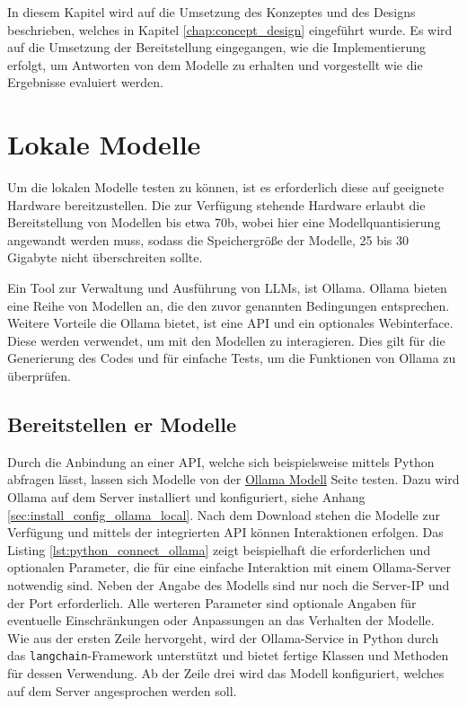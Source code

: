 In diesem Kapitel wird auf die Umsetzung des Konzeptes und des Designs beschrieben, welches in Kapitel \ref{chap:concept_design} eingeführt wurde. Es wird auf die Umsetzung der Bereitstellung eingegangen, wie die Implementierung erfolgt, um Antworten von dem Modelle zu erhalten und vorgestellt wie die Ergebnisse evaluiert werden.

\section{Lokale Modelle}
Um die lokalen Modelle testen zu können, ist es erforderlich diese auf geeignete Hardware bereitzustellen. Die zur Verfügung stehende Hardware erlaubt die Bereitstellung von Modellen bis etwa 70b, wobei hier eine Modellquantisierung angewandt werden muss, sodass die Speichergröße der Modelle, 25 bis 30 Gigabyte nicht überschreiten sollte.\vspace{0.2cm}

Ein Tool zur Verwaltung und Ausführung von LLMs, ist Ollama. Ollama bieten eine Reihe von Modellen an, die den zuvor genannten Bedingungen entsprechen. Weitere Vorteile die Ollama bietet, ist eine API und ein optionales Webinterface. Diese werden verwendet, um mit den Modellen zu interagieren. Dies gilt für die Generierung des Codes und für einfache Tests, um die Funktionen von Ollama zu überprüfen.\vspace{0.2cm}


\subsection{Bereitstellen er Modelle}
Durch die Anbindung an einer API, welche sich beispielsweise mittels Python abfragen lässt, lassen sich Modelle von der \href{https://ollama.com/search}{Ollama Modell} Seite testen. Dazu wird Ollama auf dem Server installiert und konfiguriert, siehe Anhang \ref{sec:install_config_ollama_local}. Nach dem Download stehen die Modelle zur Verfügung und mittels der integrierten API können Interaktionen erfolgen. Das Listing \ref{lst:python_connect_ollama} zeigt beispielhaft die erforderlichen und optionalen Parameter, die für eine einfache Interaktion mit einem Ollama-Server notwendig sind. Neben der Angabe des Modells sind nur noch die Server-IP und der Port erforderlich. Alle werteren Parameter sind optionale Angaben für eventuelle Einschränkungen oder Anpassungen an das Verhalten der Modelle. Wie aus der ersten Zeile hervorgeht, wird der Ollama-Service in Python durch das \texttt{langchain}-Framework unterstützt und bietet fertige Klassen und Methoden für dessen Verwendung. Ab der Zeile drei wird das Modell konfiguriert, welches auf dem Server angesprochen werden soll.\vspace{0.2cm}


